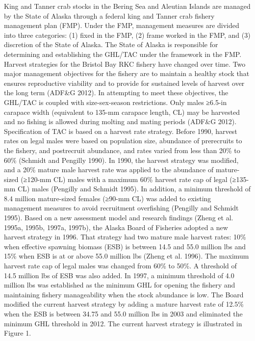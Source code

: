 \documentclass[]{article}
\begin{document}
King and Tanner crab stocks in the Bering Sea and Aleutian Islands are
managed by the State of Alaska through a federal king and Tanner crab
fishery management plan (FMP). Under the FMP, management measures are
divided into three categories: (1) fixed in the FMP, (2) frame worked in
the FMP, and (3) discretion of the State of Alaska. The State of Alaska
is responsible for determining and establishing the GHL/TAC under the
framework in the FMP. Harvest strategies for the Bristol Bay RKC fishery
have changed over time. Two major management objectives for the fishery
are to maintain a healthy stock that ensures reproductive viability and
to provide for sustained levels of harvest over the long term (ADF\&G
2012). In attempting to meet these objectives, the GHL/TAC is coupled
with size-sex-season restrictions. Only males ≥6.5-in carapace width
(equivalent to 135-mm carapace length, CL) may be harvested and no
fishing is allowed during molting and mating periods (ADF\&G 2012).
Specification of TAC is based on a harvest rate strategy. Before 1990,
harvest rates on legal males were based on population size, abundance of
prerecruits to the fishery, and postrecruit abundance, and rates varied
from less than 20\% to 60\% (Schmidt and Pengilly 1990). In 1990, the
harvest strategy was modified, and a 20\% mature male harvest rate was
applied to the abundance of mature-sized (≥120-mm CL) males with a
maximum 60\% harvest rate cap of legal (≥135-mm CL) males (Pengilly and
Schmidt 1995). In addition, a minimum threshold of 8.4 million
mature-sized females (≥90-mm CL) was added to existing management
measures to avoid recruitment overfishing (Pengilly and Schmidt 1995).
Based on a new assessment model and research findings (Zheng et al.
1995a, 1995b, 1997a, 1997b), the Alaska Board of Fisheries adopted a new
harvest strategy in 1996. That strategy had two mature male harvest
rates: 10\% when effective spawning biomass (ESB) is between 14.5 and
55.0 million lbs and 15\% when ESB is at or above 55.0 million lbs
(Zheng et al. 1996). The maximum harvest rate cap of legal males was
changed from 60\% to 50\%. A threshold of 14.5 million lbs of ESB was
also added. In 1997, a minimum threshold of 4.0 million lbs was
established as the minimum GHL for opening the fishery and maintaining
fishery manageability when the stock abundance is low. The Board
modified the current harvest strategy by adding a mature harvest rate of
12.5\% when the ESB is between 34.75 and 55.0 million lbs in 2003 and
eliminated the minimum GHL threshold in 2012. The current harvest
strategy is illustrated in Figure 1.
\end{document}
